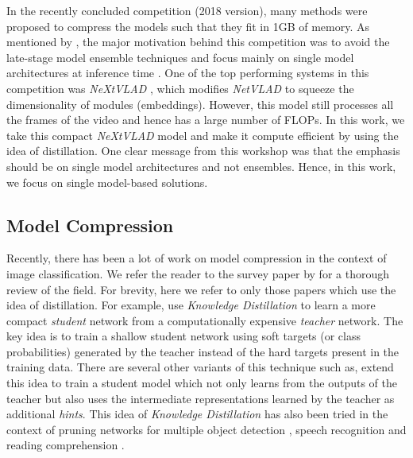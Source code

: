 \documentclass[10pt,twocolumn,letterpaper]{article}
\begin{document}
In the recently concluded competition (2018 version), many methods \cite{paper1,paper2,paper3,paper4,paper5,paper6,paper9,summary-paper} were proposed to compress the models such that they fit in 1GB of memory. As mentioned by \cite{summary-paper}, the major motivation behind this competition was to avoid the late-stage model ensemble techniques and focus mainly on single model architectures at inference time \cite{paper9,paper3, paper5}. One of the top performing systems in this competition was \textit{NeXtVLAD} \cite{paper3}, which modifies \textit{NetVLAD} \cite{willow} to squeeze the dimensionality of modules (embeddings). However, this model still processes all the frames of the video and hence has a large number of FLOPs. In this work, we take this compact \textit{NeXtVLAD} model and make it compute efficient by using the idea of distillation. One clear message from this workshop was that the emphasis should be on single model architectures and not ensembles. Hence, in this work, we focus on single model-based solutions. \subsection{Model Compression} Recently, there has been a lot of work on model compression in the context of image classification. We refer the reader to the survey paper by \cite{survey-model-compression} for a thorough review of the field. For brevity, here we refer to only those papers which use the idea of distillation. For example, \cite{do-deep-really-deep,know-distill,distill,obd-know-distill} use \textit{Knowledge Distillation} to learn a more compact \textit{student} network from a computationally expensive \textit{teacher} network. The key idea is to train a shallow student network using soft targets (or class probabilities) generated by the teacher instead of the hard targets present in the training data. There are several other variants of this technique such as, \cite{fitnets} extend this idea to train a student model which not only learns from the outputs of the teacher but also uses the intermediate representations learned by the teacher as additional \textit{hints}. 
This idea of \textit{Knowledge Distillation} has also been tried in the context of pruning networks for multiple object detection \cite{obd-know-distill}, speech recognition \cite{seq-teastud-speech} and reading comprehension \cite{att-distill-nlp}. 
\end{document}
